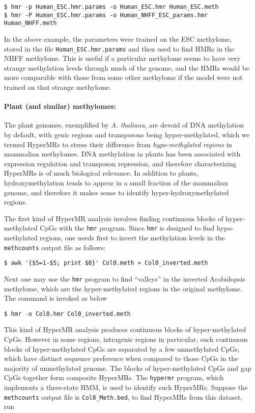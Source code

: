 \documentclass[10pt]{article}
\newcommand{\prog}[1]{\texttt{#1}}
\newcommand{\fn}[1]{\texttt{#1}}
\begin{document}
\begin{verbatim}
$ hmr -p Human_ESC.hmr.params -o Human_ESC.hmr Human_ESC.meth
$ hmr -P Human_ESC.hmr.params -o Human_NHFF_ESC_params.hmr Human_NHFF.meth
\end{verbatim}

In the above example, the parameters were trained on the ESC
methylome, stored in the file \fn{Human\_ESC.hmr.params} and then
used to find HMRs in the NHFF methylome.
This is useful if a particular methylome
seems to have very strange methylation levels through much of the
genome, and the HMRs would be more comparable with those from some
other methylome if the model were not trained on that strange
methylome.

\paragraph{Plant (and similar) methylomes:} 
The plant genomes, exemplified by \textit{A. thaliana}, are devoid of
DNA methylation by default, with genic regions and transposons being
hyper-methylated, which we termed HyperMRs to stress their difference
from \textit{hypo-methylated regions} in mammalian methylomes. DNA
methylation in plants has been associated with expression regulation
and transposon repression, and therefore characterizing HyperMRs is of
much biological relevance. In addition to plants, hydroxymethylation
tends to appear in a small fraction of the mammalian genome, and therefore
it makes sense to identify hyper-hydroxymethylated regions.

The first kind of HyperMR analysis involves finding continuous blocks
of hyper-methylated CpGs with the \prog{hmr} program. Since \prog{hmr}
is designed to find hypo-methylated regions, one needs first to invert
the methylation levels in the \prog{methcounts} output file as
follows:

\begin{verbatim}
$ awk '{$5=1-$5; print $0}' Col0.meth > Col0_inverted.meth
\end{verbatim}

Next one may use the \prog{hmr} program to find ``valleys'' in the
inverted Arabidopsis methylome, which are the hyper-methylated regions
in the original methylome. The command is invoked as below

\begin{verbatim}
$ hmr -o Col0.hmr Col0_inverted.meth
\end{verbatim}

This kind of HyperMR analysis produces continuous blocks of
hyper-methylated CpGs. However in some regions, intragenic regions in
particular, such continuous blocks of hyper-methylated CpGs are
separated by a few unmethylated CpGs, which have distinct sequence
preference when compared to those CpGs in the majority of unmethylated
genome. The blocks of hyper-methylated CpGs and gap CpGs together form
composite HyperMRs. The \prog{hypermr} program, which implements a
three-state HMM, is used to identify such HyperMRs. Suppose the
\prog{methcounts} output file is \fn{Col0\_Meth.bed}, to find HyperMRs
from this dataset, run
\end{document}
